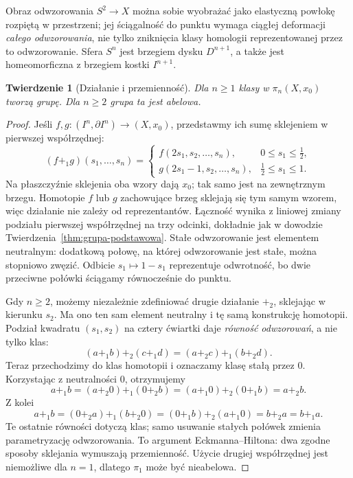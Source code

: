 \documentclass[11pt,a4paper,oneside]{report}
\theoremstyle{plain}
\newtheorem{twierdzenie}{Twierdzenie}[section]
\theoremstyle{definition}
\theoremstyle{remark}
\begin{document}
Obraz odwzorowania $S^2\to X$ można sobie wyobrażać jako
elastyczną powłokę rozpiętą w przestrzeni; jej
ściągalność do punktu wymaga ciągłej deformacji
\emph{całego odwzorowania}, nie tylko zniknięcia klasy
homologii reprezentowanej przez to odwzorowanie. Sfera $S^n$ jest brzegiem dysku $D^{n+1}$,
a także jest homeomorficzna z brzegiem kostki $I^{n+1}$.

\begin{twierdzenie}[Działanie i przemienność]
\label{thm:pi-n-abelowe}
Dla $n\geq1$ klasy w $\pi_n(X,x_0)$ tworzą grupę.
Dla $n\geq2$ grupa ta jest abelowa.
\end{twierdzenie}
\begin{proof}
Jeśli $f,g:(I^n,\partial I^n)\to(X,x_0)$,
przedstawmy ich sumę sklejeniem w pierwszej
współrzędnej:
\[
 (f+_1g)(s_1,\ldots,s_n)=
 \begin{cases}
 f(2s_1,s_2,\ldots,s_n),&0\leq s_1\leq\tfrac12,\\
 g(2s_1-1,s_2,\ldots,s_n),&\tfrac12\leq s_1\leq1.
 \end{cases}
\]
Na płaszczyźnie sklejenia oba wzory dają
$x_0$; tak samo jest na zewnętrznym brzegu.
Homotopie $f$ lub $g$ zachowujące brzeg
sklejają się tym samym wzorem, więc działanie
nie zależy od reprezentantów. Łączność
wynika z liniowej zmiany podziału pierwszej
współrzędnej na trzy odcinki, dokładnie jak
w dowodzie Twierdzenia~\ref{thm:grupa-podstawowa}.
Stałe odwzorowanie jest elementem neutralnym:
dodatkową połowę, na której odwzorowanie jest stałe,
można stopniowo zwęzić. Odbicie
$s_1\mapsto1-s_1$ reprezentuje odwrotność,
bo dwie przeciwne połówki ściągamy
równocześnie do punktu.

Gdy $n\geq2$, możemy niezależnie zdefiniować
drugie działanie $+_2$, sklejając w kierunku
$s_2$. Ma ono ten sam element neutralny
i tę samą konstrukcję homotopii. Podział
kwadratu $(s_1,s_2)$ na cztery ćwiartki
daje \emph{równość odwzorowań}, a nie tylko klas:
\[
 (a+_1 b)+_2(c+_1d)
   =(a+_2c)+_1(b+_2d).
\]
Teraz przechodzimy do klas homotopii i oznaczamy klasę stałą przez $0$.
Korzystając z neutralności $0$, otrzymujemy
\[
 a+_1b=(a+_2 0)+_1(0+_2 b)
      =(a+_1 0)+_2(0+_1 b)=a+_2b.
\]
Z kolei
\[
 a+_1b=(0+_2a)+_1(b+_2 0)
      =(0+_1b)+_2(a+_1 0)=b+_2a=b+_1a.
\]
Te ostatnie równości dotyczą klas; samo usuwanie stałych połówek
zmienia parametryzację odwzorowania.
To argument Eckmanna--Hiltona: dwa
zgodne sposoby sklejania wymuszają
przemienność. Użycie drugiej
współrzędnej jest niemożliwe dla
$n=1$, dlatego $\pi_1$ może być
nieabelowa.
\end{proof}
\end{document}
